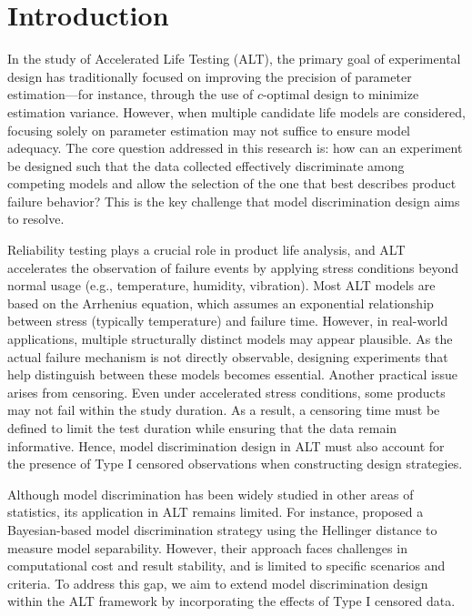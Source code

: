 \chapter{Introduction \label{CH: intro}}

\hspace*{8mm} In the study of Accelerated Life Testing (ALT), the primary goal of experimental design has traditionally focused on improving the precision of parameter estimation—for instance, through the use of $c$-optimal design to minimize estimation variance. However, when multiple candidate life models are considered, focusing solely on parameter estimation may not suffice to ensure model adequacy. The core question addressed in this research is: how can an experiment be designed such that the data collected effectively discriminate among competing models and allow the selection of the one that best describes product failure behavior? This is the key challenge that model discrimination design aims to resolve.

\hspace*{8mm} Reliability testing plays a crucial role in product life analysis, and ALT accelerates the observation of failure events by applying stress conditions beyond normal usage (e.g., temperature, humidity, vibration). Most ALT models are based on the Arrhenius equation, which assumes an exponential relationship between stress (typically temperature) and failure time. However, in real-world applications, multiple structurally distinct models may appear plausible. As the actual failure mechanism is not directly observable, designing experiments that help distinguish between these models becomes essential. Another practical issue arises from censoring. Even under accelerated stress conditions, some products may not fail within the study duration. As a result, a censoring time must be defined to limit the test duration while ensuring that the data remain informative. Hence, model discrimination design in ALT must also account for the presence of Type I censored observations when constructing design strategies.

\hspace*{8mm} Although model discrimination has been widely studied in other areas of statistics, its application in ALT remains limited. For instance, \cite{nasir2015simulation} proposed a Bayesian-based model discrimination strategy using the Hellinger distance to measure model separability. However, their approach faces challenges in computational cost and result stability, and is limited to specific scenarios and criteria. To address this gap, we aim to extend model discrimination design within the ALT framework by incorporating the effects of Type I censored data.

